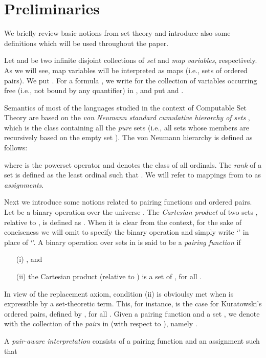 \documentclass[submission,copyright,creativecommons]{eptcs}
\begin{document}
\section{Preliminaries}\label{PREL}

We briefly review basic notions from set theory and introduce
also some definitions which will be used throughout the paper.

Let  and
 be two infinite disjoint
collections of \emph{set} and \emph{map variables},
respectively.  As we will see, map variables will be interpreted as
maps (i.e., sets of ordered pairs).  We put .
For a formula , we write  for the collection
of variables occurring free (i.e., not bound by any quantifier) in
, and put  and .

Semantics of most of the languages studied in the context of
Computable Set Theory are based on the \emph{von Neumann standard
cumulative hierarchy of sets} , which is the class containing
all the \emph{pure} sets (i.e., all sets whose members are recursively
based on the empty set ).  The von Neumann hierarchy 
is defined as follows:

where  is the powerset operator and
 denotes the class of all ordinals. 
The \emph{rank}
 of a set  is defined as the least ordinal
 such that .
We will refer to mappings from 
 to  as \emph{assignments}.

Next we introduce some notions related to pairing functions and
ordered pairs.
Let  be a binary operation over the universe \VNU.
The \emph{Cartesian product}  of two sets , relative to , is defined as
.
When it is clear from the context, for the sake of conciseness we
will omit to specify the binary operation  and simply write 
`' in place of `'.
A binary operation  over sets in \VNU  is said to be a 
\emph{pairing function} if
\begin{itemize}
    \item[(i)] 
    , and

    \item[(ii)] the Cartesian product  (relative to
    ) is a set of \VNU, for all .
\end{itemize}
In view of the replacement axiom, condition (ii) is obvioulsy met 
when  is expressible by a set-theoretic term. This, for 
instance, is the case for Kuratowski's ordered pairs, defined by 
,
for all .
Given a pairing function  and a set , we denote with
 the collection of the \emph{pairs} in  (with respect
to ), namely
.


A \emph{pair-aware interpretation} 
consists of a pairing function  and an assignment
 such that
 
\end{document}
